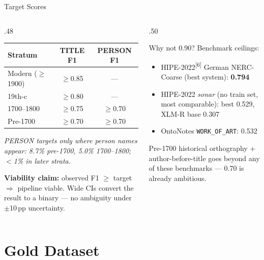 \documentclass[xcolor,aspectratio=169,compress]{beamer}
\begin{document}
\begin{frame}{Target Scores}
  \small
  \begin{columns}
    \begin{column}{.48\textwidth}
      \begin{center}
      \begin{tabular}{lcc}
        \toprule
        Stratum & TITLE F1 & PERSON F1 \\
        \midrule
        Modern ($\geq$1900) & $\geq$0.85 & --- \\
        19th-c              & $\geq$0.80 & --- \\
        1700--1800          & $\geq$0.75 & $\geq$0.70 \\
        Pre-1700            & $\geq$0.70 & $\geq$0.70 \\
        \bottomrule
      \end{tabular}
      \end{center}
      \smallskip
      \textit{PERSON targets only where person names appear:
        8.7\% pre-1700, 5.0\% 1700--1800; $<$1\% in later strata.}
      \smallskip
      
      \textbf{Viability claim:} observed F1 $\geq$ target $\Rightarrow$ pipeline viable.
      Wide CIs convert the result to a binary --- no ambiguity under $\pm$10\,pp uncertainty.
    \end{column}
    \begin{column}{.50\textwidth}
      \begin{block}{Why not 0.90? Benchmark ceilings:}
        \begin{itemize}\setlength{\itemsep}{2pt}
          \item HIPE-2022\textsuperscript{[6]} German NERC-Coarse (best system): \textbf{0.794}
          \item HIPE-2022 \textit{sonar} (no train set, most comparable):
                best 0.529, XLM-R base 0.307
          \item OntoNotes \texttt{WORK\_OF\_ART}: 0.532
        \end{itemize}
        Pre-1700 historical orthography + author-before-title goes
        beyond any of these benchmarks --- 0.70 is already ambitious.
      \end{block}
    \end{column}
  \end{columns}
\end{frame}

\section{Gold Dataset}
\end{document}
